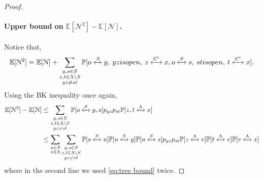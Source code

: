 \documentclass[11pt,a4paper]{article}
\numberwithin{equation}{section}
\theoremstyle{plain}
\theoremstyle{definition}
\newcommand{\connect}{\xleftrightarrow}
\begin{document}
\begin{proof}
\paragraph{Upper bound on $\mathbb E[\mathcal N^2]-\mathbb E[\mathcal N]$.} Notice that,
\begin{equation}
	\mathbb E[\mathcal N^2]=\mathbb E[\mathcal N]+\sum_{\substack{y,s\in S\\ z,t\in \Lambda \setminus S\\ yz\neq st}}\mathbb P[o\connect{S}y, \: yz \textup{ is open}, \: z \connect{\mathcal C^c\:}x, o\connect{S\:}s, \: st \textup{ is open}, \: t \connect{\mathcal C^c\:}x].
\end{equation}
Using the BK inequality once again,
\begin{align}\notag
	\mathbb E[\mathcal N^2]-\mathbb E[\mathcal N]&\leq \sum_{\substack{y,s\in S\\ z,t\in \Lambda \setminus S\\ yz\neq st}}\mathbb P[o\connect{S\:}y,s]p_{yz}p_{st}\mathbb P[z,t\connect{\Lambda\:}x]\\
	&\leq \sum_{\substack{u\in S\\v\in \Lambda}}\sum_{\substack{y,s\in S\\ z,t\in \Lambda \setminus S\\ yz\neq st}}\mathbb P[o\connect{S\:}u]\mathbb P[u\connect{S\:}y]\mathbb P[u\connect{S\:}s]p_{yz}p_{st}\mathbb P[z\connect{\Lambda\:}v]\mathbb P[t\connect{\Lambda\:}v]\mathbb P[v\connect{\Lambda\:}x]\label{eq:proofSL6}
	\end{align}
	where in the second line we used \eqref{eq:tree bound} twice.

\end{proof}
\end{document}
